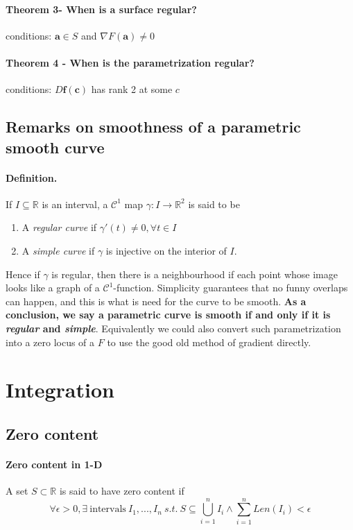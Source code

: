 \documentclass[11pt]{article}
\newcommand{\tb}[1]{\textbf{#1}}
\newcommand{\real}[0]{\mathbb{R}}
\begin{document}
\paragraph{Theorem 3- When is a surface regular?}
conditions: $\tb{a} \in S$ and $\nabla F(\tb{a}) \neq 0$
\paragraph{Theorem 4 - When is the parametrization regular?}
conditions: $D\tb{f}(\tb{c})$ has rank 2 at some $c$

\subsection{Remarks on smoothness of a parametric smooth curve} 
\paragraph{Definition.}If $I\subseteq \real$ is an interval, a $\mathcal{C}^1$ map $\gamma: I \rightarrow{} \real^2$ is said to be
\begin{enumerate}
    \item A \textit{regular curve} if $\gamma'(t)\neq 0, \forall t\in I$
    \item A \textit{simple curve} if $\gamma$ is injective on the interior of $I$.
\end{enumerate}
Hence if $\gamma$ is regular, then there is a neighbourhood if each point whose image looks like a graph of a $\mathcal{C}^1$-function. Simplicity guarantees that no funny overlaps can happen, and this is what is need for the curve to be smooth. \textbf{As a conclusion, we say a parametric curve is smooth if and only if it is \textit{regular} and \textit{simple}}. Equivalently we could also convert such parametrization into a zero locus of a $F$ to use the good old method of gradient directly.

\section{Integration}
\subsection{Zero content}
\paragraph{Zero content in 1-D} A set $S\subset \real$ is said to have zero content if
\begin{equation*}
    \forall \epsilon > 0, \exists~\text{intervals}~I_1,...,I_n ~s.t.~ S\subseteq \bigcup_{i=1}^{n}I_i \wedge \sum_{i=1}^{n}{Len(I_i)} < \epsilon
\end{equation*}
\end{document}
